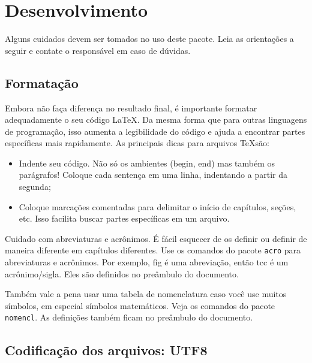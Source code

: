 \chapter{Desenvolvimento}\label{desenvolvimento}

Alguns cuidados devem ser tomados no uso deste pacote.
  Leia as orientações a seguir e contate o responsável em caso de dúvidas.


\section{Formatação}

Embora não faça diferença no resultado final, é importante formatar adequadamente o seu código \LaTeX.
  Da mesma forma que para outras linguagens de programação, isso aumenta a legibilidade do código e ajuda a encontrar partes específicas mais rapidamente.
  As principais dicas para arquivos \TeX são:
 \begin{itemize}
   \item Indente seu código. Não só os ambientes (begin, end) mas também os parágrafos! Coloque cada sentença em uma linha, indentando a partir da segunda;
   \item Coloque marcações comentadas para delimitar o início de capítulos, seções, etc. Isso facilita buscar partes específicas em um arquivo.
 \end{itemize}

Cuidado com abreviaturas e acrônimos.
  É fácil esquecer de os definir ou definir de maneira diferente em capítulos diferentes.
  Use os comandos do pacote \texttt{acro} para abreviaturas e acrônimos.
  Por exemplo, \ac{fig} é uma abreviação, então \ac{tcc} é um acrônimo/sigla.
  Eles são definidos no preâmbulo do documento.

Também vale a pena usar uma tabela de nomenclatura caso você use muitos símbolos, em especial símbolos matemáticos.
  Veja os comandos do pacote \texttt{nomencl}.
  As definições também ficam no preâmbulo do documento.


\section{Codificação dos arquivos: UTF8}

